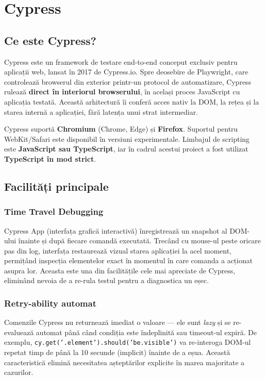 \chapter{Cypress}

\section{Ce este Cypress?}

Cypress este un framework de testare end-to-end conceput exclusiv pentru aplicații web,
lansat în 2017 de Cypress.io. Spre deosebire de Playwright, care controlează
browserul din exterior printr-un protocol de automatizare, Cypress rulează \textbf{direct
în interiorul browserului}, în același proces JavaScript cu aplicația testată. Această
arhitectură îi conferă acces nativ la DOM, la rețea și la starea internă a aplicației,
fără latența unui strat intermediar.

Cypress suportă \textbf{Chromium} (Chrome, Edge) și \textbf{Firefox}. Suportul pentru
WebKit/Safari este disponibil în versiuni experimentale. Limbajul de scripting este
\textbf{JavaScript sau TypeScript}, iar în cadrul acestui proiect a fost utilizat
\textbf{TypeScript în mod strict}.

\section{Facilități principale}

\subsection{Time Travel Debugging}

Cypress App (interfața grafică interactivă) înregistrează un snapshot al DOM-ului înainte
și după fiecare comandă executată. Trecând cu mouse-ul peste oricare pas din log, interfața
restaurează vizual starea aplicației la acel moment, permițând inspecția elementelor exact
în momentul în care comanda a acționat asupra lor. Aceasta este una din facilitățile cele
mai apreciate de Cypress, eliminând nevoia de a re-rula testul pentru a diagnostica un eșec.

\subsection{Retry-ability automat}

Comenzile Cypress nu returnează imediat o valoare --- ele sunt \textit{lazy} și se re-evaluează
automat până când condiția este îndeplinită sau timeout-ul expiră. De exemplu,
\texttt{cy.get('.element').should('be.visible')} va re-interoga DOM-ul repetat timp de până la
10 secunde (implicit) înainte de a eșua. Această caracteristică elimină necesitatea
așteptărilor explicite în marea majoritate a cazurilor.

